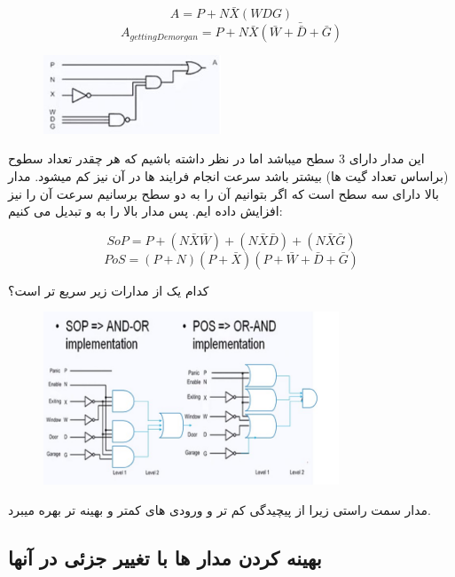 \documentclass[20pt, a4paper]{article}
\begin{document}
\begin{equation}
	A = P + N\bar{X}(WDG)
\end{equation}
\begin{equation}
	A_{getting Demorgan} = P + N\bar{X}\bar{(\bar{W}+ \bar{D} + \bar{G})}
\end{equation}
\begin{figure}[htbp]\centering
	\centerline{\includegraphics[width=150pt]{img/analyze/m3.jpg}}
\end{figure}

اين مدار دارای 3 سطح میباشد
اما در نظر داشته باشیم که هر چقدر تعداد سطوح (براساس تعداد گیت ها)
بیشتر باشد سرعت انجام فرایند ها در آن نیز کم میشود.
مدار بالا دارای سه سطح است که اگر بتوانیم آن را به دو سطح
برسانیم سرعت آن را نیز افزایش داده ایم.
پس مدار بالا را به 
و
تبدیل می کنیم:

\begin{equation}
	SoP = P + (N\bar{X}\bar{W}) + (N\bar{X}\bar{D}) + (N\bar{X}\bar{G}) 
\end{equation}
\begin{equation}
	PoS = (P+N)(P+\bar{X})(P+\bar{W}+\bar{D}+\bar{G})
\end{equation}

کدام یک از مدارات زیر سریع تر است؟
\begin{figure}[htbp]\centering
	\centerline{\includegraphics[width=250pt]{img/analyze/m4.jpg}}
\end{figure}

مدار سمت راستی زیرا از پیچیدگی کم تر و ورودی های کمتر و بهینه تر بهره میبرد.

\newpage
\subsection{بهینه کردن مدار ها با تغییر جزئی در آنها}
\end{document}

